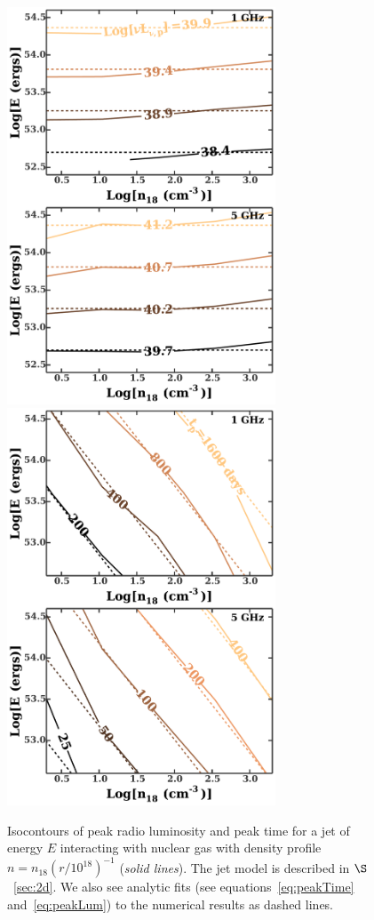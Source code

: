\documentclass[usenatbib,fleqn]{mnras}
\begin{document}
\begin{figure}
  \includegraphics[width=8cm]{lp_contours.pdf}
  \includegraphics[width=8cm]{tp_contours.pdf}
  \caption{\label{fig:jetContours} Isocontours of peak radio
    luminosity and peak time for a jet of energy $E$ interacting with
    nuclear gas with density profile $n=n_{18}
    \left(r/10^{18}\right)^{-1}$ (\textit{solid lines}). The jet model is described in 
  $\S$~\ref{sec:2d}. We also see analytic fits (see
  equations~\eqref{eq:peakTime} and~\eqref{eq:peakLum}) to the
  numerical results as dashed lines.}
\end{figure}
\end{document}
